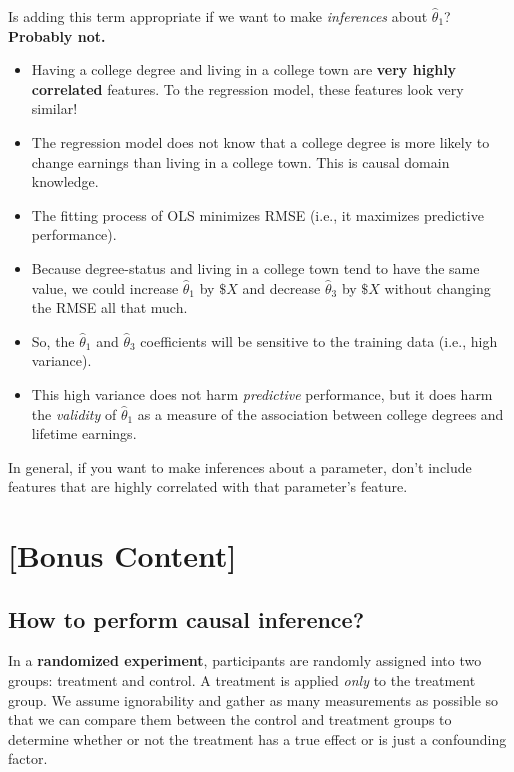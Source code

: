 \documentclass[
  letterpaper,
  DIV=11,
  numbers=noendperiod]{scrreprt}
\begin{document}
Is adding this term appropriate if we want to make \emph{inferences}
about \(\hat{\theta}_1\)? \textbf{Probably not.}

\begin{itemize}
\item
  Having a college degree and living in a college town are \textbf{very
  highly correlated} features. To the regression model, these features
  look very similar!
\item
  The regression model does not know that a college degree is more
  likely to change earnings than living in a college town. This is
  causal domain knowledge.
\item
  The fitting process of OLS minimizes RMSE (i.e., it maximizes
  predictive performance).
\item
  Because degree-status and living in a college town tend to have the
  same value, we could increase \(\hat{\theta}_1\) by \(\$X\) and
  decrease \(\hat{\theta}_3\) by \(\$X\) without changing the RMSE all
  that much.
\item
  So, the \(\hat{\theta}_1\) and \(\hat{\theta}_3\) coefficients will be
  sensitive to the training data (i.e., high variance).
\item
  This high variance does not harm \emph{predictive} performance, but it
  does harm the \emph{validity} of \(\hat{\theta}_1\) as a measure of
  the association between college degrees and lifetime earnings.
\end{itemize}

In general, if you want to make inferences about a parameter, don't
include features that are highly correlated with that parameter's
feature.

\section{{[}Bonus Content{]}}\label{bonus-content}

\subsection{How to perform causal
inference?}\label{how-to-perform-causal-inference}

In a \textbf{randomized experiment}, participants are randomly assigned
into two groups: treatment and control. A treatment is applied
\emph{only} to the treatment group. We assume ignorability and gather as
many measurements as possible so that we can compare them between the
control and treatment groups to determine whether or not the treatment
has a true effect or is just a confounding factor.
\end{document}
